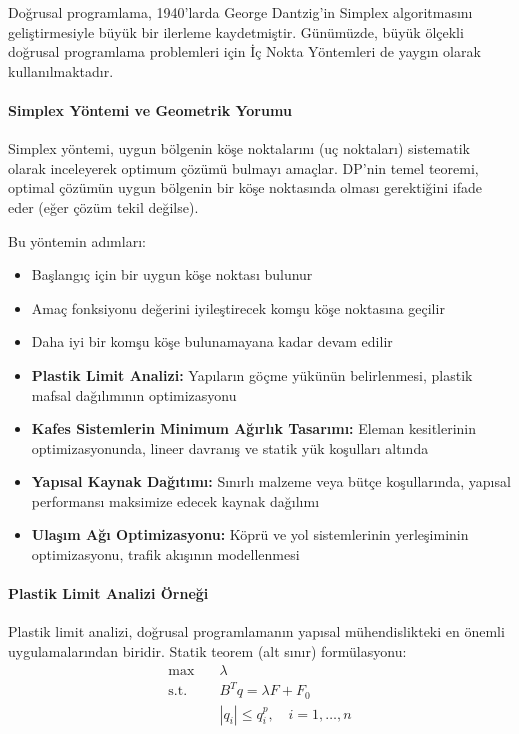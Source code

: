 Doğrusal programlama, 1940'larda George Dantzig'in Simplex algoritmasını geliştirmesiyle büyük bir ilerleme kaydetmiştir. Günümüzde, büyük ölçekli doğrusal programlama problemleri için İç Nokta Yöntemleri de yaygın olarak kullanılmaktadır.

\paragraph{Simplex Yöntemi ve Geometrik Yorumu}
Simplex yöntemi, uygun bölgenin köşe noktalarını (uç noktaları) sistematik olarak inceleyerek optimum çözümü bulmayı amaçlar. DP'nin temel teoremi, optimal çözümün uygun bölgenin bir köşe noktasında olması gerektiğini ifade eder (eğer çözüm tekil değilse).

Bu yöntemin adımları:
\begin{itemize}
    \item Başlangıç için bir uygun köşe noktası bulunur
    \item Amaç fonksiyonu değerini iyileştirecek komşu köşe noktasına geçilir
    \item Daha iyi bir komşu köşe bulunamayana kadar devam edilir
\end{itemize}



\begin{tcolorbox}[title=Yapısal Mühendislikte DP Uygulamaları]
\begin{itemize}
    \item \textbf{Plastik Limit Analizi:} Yapıların göçme yükünün belirlenmesi, plastik mafsal dağılımının optimizasyonu
    
    \item \textbf{Kafes Sistemlerin Minimum Ağırlık Tasarımı:} Eleman kesitlerinin optimizasyonunda, lineer davranış ve statik yük koşulları altında
    
    \item \textbf{Yapısal Kaynak Dağıtımı:} Sınırlı malzeme veya bütçe koşullarında, yapısal performansı maksimize edecek kaynak dağılımı
    
    \item \textbf{Ulaşım Ağı Optimizasyonu:} Köprü ve yol sistemlerinin yerleşiminin optimizasyonu, trafik akışının modellenmesi
\end{itemize}
\end{tcolorbox}

\paragraph{Plastik Limit Analizi Örneği}
Plastik limit analizi, doğrusal programlamanın yapısal mühendislikteki en önemli uygulamalarından biridir. Statik teorem (alt sınır) formülasyonu:
\begin{equation}
\begin{aligned}
\max & \quad \lambda \\
\text{s.t.} & \quad B^T q = \lambda F + F_0 \\
& \quad |q_i| \leq q_i^p, \quad i = 1, \ldots, n
\end{aligned}
\end{equation}

